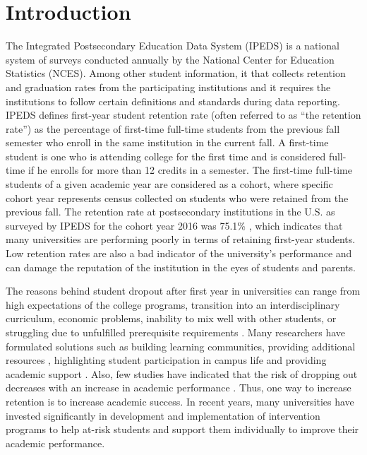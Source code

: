 \documentclass[11pt,openright]{report}
\begin{document}
\chapter{Introduction}\label{chapter:introduction} 
The Integrated Postsecondary Education Data System (IPEDS) is a national system of surveys conducted annually by the National Center for Education Statistics (NCES). Among other student information, it that collects retention and graduation rates from the participating institutions and it requires the institutions to follow certain definitions and standards during data reporting. IPEDS defines first-year student retention rate (often referred to as ``the retention rate'') as the percentage of first-time full-time students from the previous fall semester who enroll in the same institution in the current fall.  A first-time student is one who is attending college for the first time and is considered full-time if he enrolls for more than 12 credits in a semester. The first-time full-time students of a given academic year are considered as a cohort, where specific cohort year represents census collected on students who were retained from the previous fall. The retention rate at postsecondary institutions in the U.S. as surveyed by IPEDS for the cohort year 2016 was 75.1\% \cite{IPEDSRetentionRate}, which indicates that many universities are performing poorly in terms of retaining first-year students. Low retention rates are also a bad indicator of the university's performance and can damage the reputation of the institution in the eyes of students and parents. 

The reasons behind student dropout after first year in universities can range from high expectations of the college programs, transition into an interdisciplinary curriculum, economic problems, inability to mix well with other students, or struggling due to unfulfilled prerequisite requirements \cite{lau2003institutional}. Many researchers have formulated solutions such as building learning communities, providing additional resources \cite{tinto1999taking}, highlighting student participation in campus life and providing academic support \cite{lau2003institutional}. Also, few studies have indicated that the risk of dropping out decreases with an increase in academic performance \cite{Murtaugh}. Thus, one way to increase retention is to increase academic success. In recent years, many universities have invested significantly in development and implementation of intervention programs to help at-risk students and support them individually to improve their academic performance. 
\end{document}
